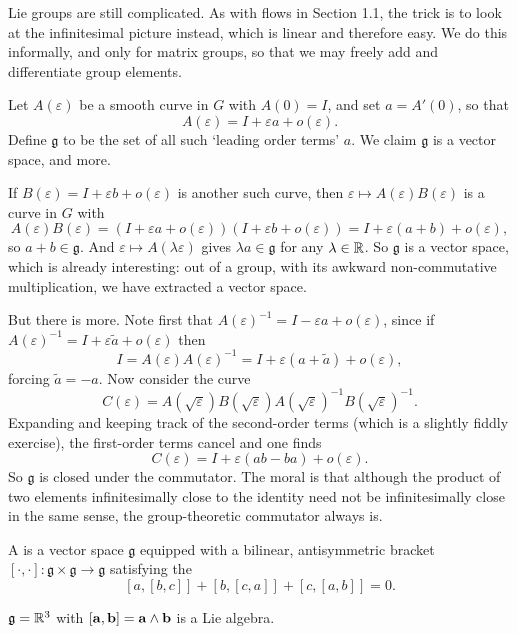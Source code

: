 \documentclass[a4paper]{scrartcl}
\newcommand{\lie}[1]{\mathfrak{#1}}
\begin{document}
Lie groups are still complicated. As with flows in Section 1.1, the trick is to look at the infinitesimal picture instead, which is linear and therefore easy. We do this informally, and only for matrix groups, so that we may freely add and differentiate group elements.

Let $A(\varepsilon)$ be a smooth curve in $G$ with $A(0) = I$, and set $a = A'(0)$, so that
$$
A(\varepsilon) = I + \varepsilon a + o(\varepsilon).
$$
Define $\lie g$ to be the set of all such `leading order terms' $a$. We claim $\lie g$ is a vector space, and more.

If $B(\varepsilon) = I + \varepsilon b + o(\varepsilon)$ is another such curve, then $\varepsilon\mapsto A(\varepsilon)B(\varepsilon)$ is a curve in $G$ with
$$
A(\varepsilon)B(\varepsilon) = \left(I+\varepsilon a + o(\varepsilon)\right)\left(I + \varepsilon b + o(\varepsilon)\right) = I + \varepsilon(a+b) + o(\varepsilon),
$$
so $a + b\in\lie g$. And $\varepsilon\mapsto A(\lambda\varepsilon)$ gives $\lambda a\in\lie g$ for any $\lambda\in\mathbb{R}$. So $\lie g$ is a vector space, which is already interesting: out of a group, with its awkward non-commutative multiplication, we have extracted a vector space.

But there is more. Note first that $A(\varepsilon)^{-1} = I - \varepsilon a + o(\varepsilon)$, since if $A(\varepsilon)^{-1} = I + \varepsilon\tilde a + o(\varepsilon)$ then
$$
I = A(\varepsilon)A(\varepsilon)^{-1} = I + \varepsilon(a+\tilde a) + o(\varepsilon),
$$
forcing $\tilde a = -a$. Now consider the curve
$$
C(\varepsilon) = A(\sqrt\varepsilon)B(\sqrt\varepsilon)A(\sqrt\varepsilon)^{-1}B(\sqrt\varepsilon)^{-1}.
$$
Expanding and keeping track of the second-order terms (which is a slightly fiddly exercise), the first-order terms cancel and one finds
$$
C(\varepsilon) = I + \varepsilon(ab - ba) + o(\varepsilon).
$$
So $\lie g$ is closed under the commutator. The moral is that although the product of two elements infinitesimally close to the identity need not be infinitesimally close in the same sense, the group-theoretic commutator always is.

\begin{definition}
	A  is a vector space $\lie g$ equipped with a bilinear, antisymmetric bracket $[\cdot,\cdot] : \lie g\times\lie g\to\lie g$ satisfying the 
	$$
	[a,[b,c]] + [b,[c,a]] + [c,[a,b]] = 0.
	$$
\end{definition}

\begin{example}
	$\lie g = \R^3$ with $[\mathbf{a}, \mathbf{b}] = \mathbf{a}\wedge\mathbf{b}$ is a Lie algebra.
\end{example}
\end{document}

